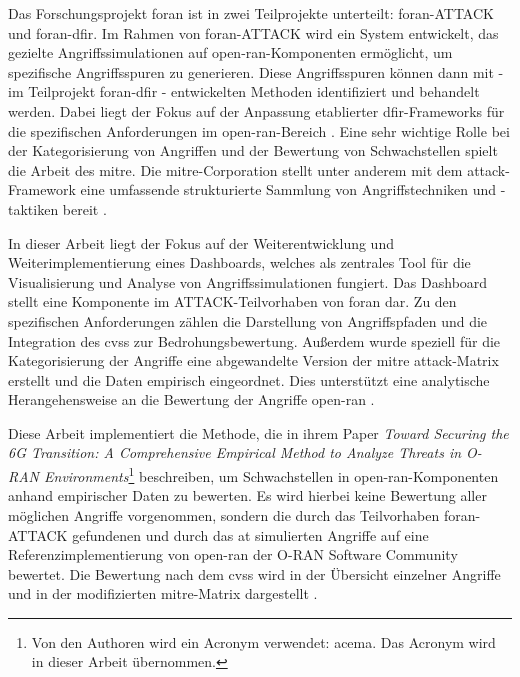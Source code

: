 \par Das Forschungsprojekt \gls{foran} ist in zwei Teilprojekte unterteilt: \gls{foran}-ATTACK und \gls{foran}-\gls{dfir}. Im Rahmen von \gls{foran}-ATTACK wird ein System entwickelt, das gezielte Angriffssimulationen auf \gls{open-ran}-Komponenten ermöglicht, um spezifische Angriffsspuren zu generieren. Diese Angriffsspuren können dann mit - im Teilprojekt \gls{foran}-\gls{dfir} - entwickelten Methoden identifiziert und behandelt werden. Dabei liegt der Fokus auf der Anpassung etablierter \gls{dfir}-Frameworks für die spezifischen Anforderungen im \gls{open-ran}-Bereich \autocite{5GFORAN}. Eine sehr wichtige Rolle bei der Kategorisierung von Angriffen und der Bewertung von Schwachstellen spielt die Arbeit des \gls{mitre}. Die \gls{mitre}-Corporation stellt unter anderem mit dem \gls{attack}-Framework eine umfassende strukturierte Sammlung von Angriffstechniken und -taktiken bereit \autocite{SolvingProblemsSafer2024,MITREATTCK}.
\par
In dieser Arbeit liegt der Fokus auf der Weiterentwicklung und Weiterimplementierung eines Dashboards, welches als zentrales Tool für die Visualisierung und Analyse von Angriffssimulationen fungiert. Das Dashboard stellt eine Komponente im ATTACK-Teilvorhaben von \gls{foran} dar. Zu den spezifischen Anforderungen zählen die Darstellung von Angriffspfaden und die Integration des \gls{cvss} zur Bedrohungsbewertung. Außerdem wurde speziell für die Kategorisierung der Angriffe eine abgewandelte Version der \gls{mitre} \gls{attack}-Matrix erstellt und die Daten empirisch eingeordnet. Dies unterstützt eine analytische Herangehensweise an die Bewertung der Angriffe \gls{open-ran} \autocite{dieterichDevelopmentAdversarySimulation2024}.
\par
Diese Arbeit implementiert die Methode, die \citeauthor{klementSecuring6GTransition2024} in ihrem Paper \textit{Toward Securing the 6G Transition: A Comprehensive Empirical Method to  Analyze Threats in O-RAN Environments}\footnote{Von den Authoren wird ein Acronym verwendet: \gls{acema}. Das Acronym wird in dieser Arbeit übernommen.} beschreiben, um Schwachstellen in \gls{open-ran}-Komponenten anhand empirischer Daten zu bewerten. Es wird hierbei keine Bewertung aller möglichen Angriffe vorgenommen, sondern die durch das Teilvorhaben \gls{foran}-ATTACK gefundenen und durch das \gls{at} simulierten Angriffe auf eine Referenzimplementierung von \gls{open-ran} der O-RAN Software Community bewertet. Die Bewertung nach dem \gls{cvss} wird in der Übersicht einzelner Angriffe und in der modifizierten \gls{mitre}-Matrix dargestellt \autocite{dieterichDevelopmentAdversarySimulation2024,klementSecuring6GTransition2024}.
